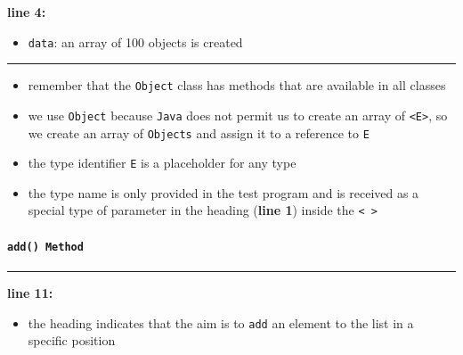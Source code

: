 \noindent
\begin{minipage}{0.15\textwidth}
    \textcolor{RedOrange}{\textbf{line 4:}}
\end{minipage}
\begin{minipage}{0.85\textwidth}
    \begin{itemize}
        \item[] \texttt{data}: an array of 100 objects is created
    \end{itemize}
\end{minipage}

\vspace{0.1cm}
\noindent
\textcolor{RedOrange}{\rule{\textwidth}{0.5pt}}

\begin{itemize}
    \item[] remember that the \texttt{Object} class has methods that are available in all classes 
    \item[] we use \texttt{Object} because \texttt{Java} does not permit us to create an array of \texttt{<E>}, so we create an array of \texttt{Objects} and assign it to a reference to \texttt{E}
    \item[] the type identifier \texttt{E} is a placeholder for any type 
    \item[] the type name is only provided in the test program and is received as a special type of parameter in the heading (\textcolor{RedOrange}{\textbf{line 1}}) inside the \texttt{< >}
\end{itemize}

\newpage

\paragraph*{\texttt{add() Method}}


\vspace{0.1cm}
\noindent
\textcolor{RedOrange}{\rule{\textwidth}{0.5pt}}
\vspace{-0.1cm}

\noindent
\begin{minipage}{0.15\textwidth}
    \textcolor{RedOrange}{\textbf{line 11:}}
\end{minipage}
\begin{minipage}{0.85\textwidth}
    \begin{itemize}
        \item[] the heading indicates that the aim is to \texttt{add} an element to the list in a specific position
    \end{itemize}
\end{minipage}


